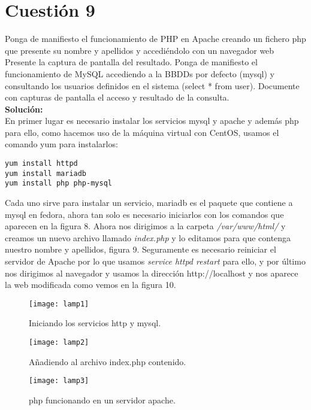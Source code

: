 \documentclass[a4paper, 11pt]{article} %
\begin{document}
\section{Cuestión 9}
Ponga de manifiesto el funcionamiento de PHP en Apache creando un fichero php que presente su nombre y apellidos y accediéndolo con un navegador web Presente la captura de pantalla del resultado. Ponga de manifiesto el funcionamiento de MySQL accediendo a la BBDDs por defecto (mysql) y consultando los usuarios definidos en el sistema (select * from user). Documente con capturas de pantalla el acceso y resultado de la consulta.\\
\textbf{Solución:}\\
En primer lugar es necesario instalar los servicios mysql y apache y además php para ello, como hacemos uso de la máquina virtual con CentOS, usamos el comando yum para instalarlos:
\begin{verbatim}
yum install httpd
yum install mariadb
yum install php php-mysql
\end{verbatim}
Cada uno sirve para instalar un servicio, mariadb es el paquete que contiene a mysql en fedora, ahora tan solo es necesario iniciarlos con los comandos que aparecen en la figura 8.
Ahora nos dirigimos a la carpeta \textit{/var/www/html/} y creamos un nuevo archivo llamado \textit{index.php} y lo editamos para que contenga nuestro nombre y apellidos, figura 9. Seguramente es necesario reiniciar el servidor de Apache por lo que usamos \textit{service httpd restart} para ello, y por último nos dirigimos al navegador y usamos la dirección http://localhost y nos aparece la web modificada como vemos en la figura 10.

\begin{figure}[h]
\centering 
\texttt{[image: lamp1]} 
\caption{Iniciando los servicios http y mysql.} 
\vspace{-0.5cm}
\label{contexto:figura} 
\end{figure}
\begin{figure}[h]
\centering 
\texttt{[image: lamp2]} 
\caption{Añadiendo al archivo index.php contenido.} 
\vspace{-0.5cm}
\label{contexto:figura} 
\end{figure}
\begin{figure}[h]
\centering 
\texttt{[image: lamp3]} 
\caption{php funcionando en un servidor apache.} 
\vspace{-0.5cm}
\label{contexto:figura} 
\end{figure}
\end{document}
